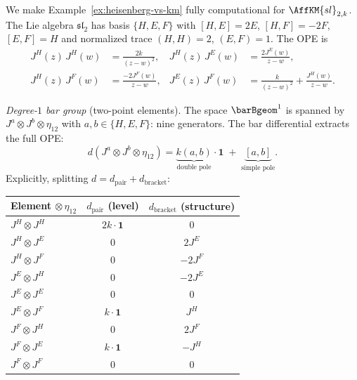 \begin{example}
\label{ex:sl2-bar-matrix}

We make Example~\ref{ex:heisenberg-vs-km} fully computational for
$\AffKM{sl}_{2,k}$.  The Lie algebra $\mathfrak{sl}_2$ has basis
$\{H, E, F\}$ with $[H, E] = 2E$, $[H, F] = -2F$, $[E, F] = H$
and normalized trace $(H, H) = 2$, $(E, F) = 1$.  The OPE is
\begin{align*}
J^H(z)\, J^H(w) &= \frac{2k}{(z-w)^2}, &
J^H(z)\, J^E(w) &= \frac{2J^E(w)}{z-w}, \\
J^H(z)\, J^F(w) &= \frac{-2J^F(w)}{z-w}, &
J^E(z)\, J^F(w) &= \frac{k}{(z-w)^2} + \frac{J^H(w)}{z-w}.
\end{align*}

\emph{Degree-$1$ bar group} (two-point elements).
The space $\barBgeom^1$ is spanned by
$J^a \otimes J^b \otimes \eta_{12}$ with
$a, b \in \{H, E, F\}$: nine generators.  The bar differential
extracts the full OPE:
\[
d(J^a \otimes J^b \otimes \eta_{12})
= \underbrace{k(a,b)}_{\text{double pole}} \cdot \mathbf{1}
  \;+\; \underbrace{[a,b]}_{\text{simple pole}}.
\]
Explicitly, splitting $d = d_{\mathrm{pair}} + d_{\mathrm{bracket}}$:

\medskip
\begin{center}
\small
\renewcommand{\arraystretch}{1.2}
\begin{tabular}{@{}l@{\;\;\;}c@{\;\;\;}c@{}}
\hline
Element $\otimes\, \eta_{12}$ & $d_{\mathrm{pair}}$ (level)
  & $d_{\mathrm{bracket}}$ (structure) \\
\hline
$J^H \otimes J^H$ & $2k \cdot \mathbf{1}$ & $0$ \\
$J^H \otimes J^E$ & $0$ & $2J^E$ \\
$J^H \otimes J^F$ & $0$ & $-2J^F$ \\
$J^E \otimes J^H$ & $0$ & $-2J^E$ \\
$J^E \otimes J^E$ & $0$ & $0$ \\
$J^E \otimes J^F$ & $k \cdot \mathbf{1}$ & $J^H$ \\
$J^F \otimes J^H$ & $0$ & $2J^F$ \\
$J^F \otimes J^E$ & $k \cdot \mathbf{1}$ & $-J^H$ \\
$J^F \otimes J^F$ & $0$ & $0$ \\
\hline
\end{tabular}
\end{center}
\medskip


\end{example}
